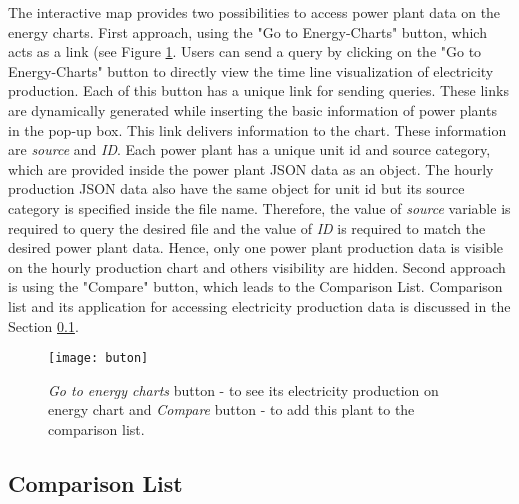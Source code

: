 The interactive map provides two possibilities to access power plant data on the energy charts. First approach, using the "Go to Energy-Charts" button, which acts as a link (see Figure \ref{fig:buttons}.  Users can send a query by clicking on the "Go to Energy-Charts" button to directly view the time line visualization of electricity production. Each of this button has a unique link for sending queries. These links are dynamically generated while inserting the basic information of power plants in the pop-up box. This link delivers information to the chart. These information are \textit{source} and \textit{ID}. Each power plant has a unique unit id and source category, which are provided inside the power plant JSON data as an object. The hourly production JSON data also have the same object for unit id but its source category is specified inside the file name. Therefore, the value of \textit{source} variable is required to query the desired file and the value of \textit{ID} is required to match the desired power plant data. Hence, only one power plant production data is visible on the hourly production chart and others visibility are hidden. Second approach is using the "Compare" button, which leads to the Comparison List. Comparison list and its application for accessing electricity production data is discussed in the Section \ref{sssec:comparisonList}.

\begin{figure}
\centering
\texttt{[image: buton]}
\caption[Buttons inside pop-up box]{\textit{Go to energy charts} button - to see its electricity production on energy chart and \textit{Compare} button - to add this plant to the comparison list.}
\label{fig:buttons}
\end{figure}

\subsection{Comparison List}
\label{sssec:comparisonList}

